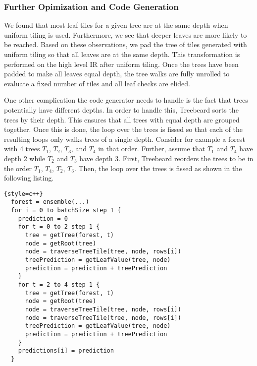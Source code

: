 \subsubsection{Further Opimization and Code Generation}
We found that most leaf tiles for a given tree are at the same depth when uniform tiling is used. Furthermore, we see that deeper leaves 
are more likely to be reached.
Based on these observations, we pad the tree of tiles generated with uniform tiling so that all leaves are at the same depth.
This transformation is performed on the high level IR after uniform tiling. 
Once the trees have been padded to make all leaves equal depth, the tree walks are fully unrolled to evaluate a fixed 
number of tiles and all leaf checks are elided.

One other complication the code generator needs to handle is the fact that trees potentially have different depths. In order to handle
this, Treebeard sorts the trees by their depth. This ensures that all trees with equal depth are grouped together. Once this is done, 
the loop over the trees is fissed so that each of the resulting loops only walks trees of a single depth. Consider for example a 
forest with 4 trees $T_1$, $T_2$, $T_3$, and $T_4$ in that order. Further, assume that $T_1$ and $T_4$ have depth 2 while $T_2$ and $T_3$
have depth 3. First, Treebeard reorders the trees to be in the order $T_1$, $T_4$, $T_2$, $T_3$. Then, the loop over the trees is fissed
as shown in the following listing.

\begin{lstlisting}{style=c++}
  forest = ensemble(...)
  for i = 0 to batchSize step 1 {
    prediction = 0
    for t = 0 to 2 step 1 {
      tree = getTree(forest, t) 
      node = getRoot(tree)
      node = traverseTreeTile(tree, node, rows[i])
      treePrediction = getLeafValue(tree, node)
      prediction = prediction + treePrediction
    }
    for t = 2 to 4 step 1 {
      tree = getTree(forest, t) 
      node = getRoot(tree)
      node = traverseTreeTile(tree, node, rows[i])
      node = traverseTreeTile(tree, node, rows[i])
      treePrediction = getLeafValue(tree, node)
      prediction = prediction + treePrediction
    }
    predictions[i] = prediction
  }  
\end{lstlisting}

